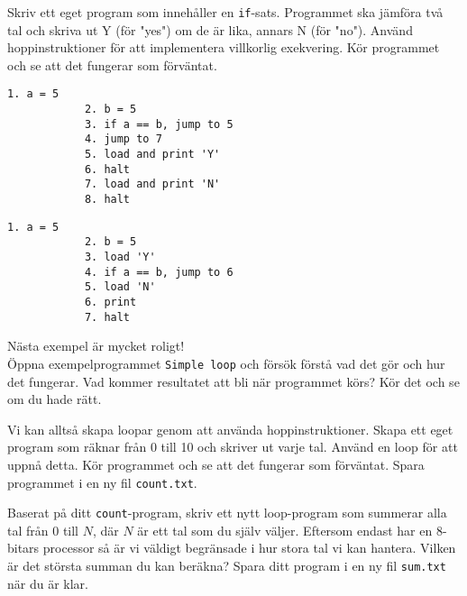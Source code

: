 \begin{Datorarbete}
    \item Skriv ett eget program som innehåller en \texttt{if}-sats. Programmet ska jämföra två tal och skriva ut Y (för "yes") om de är lika, annars N (för "no"). Använd hoppinstruktioner för att implementera villkorlig exekvering. Kör programmet och se att det fungerar som förväntat.

    \begin{minipage}[t]{0.42\textwidth}
        \begin{lstlisting}[xleftmargin=-15mm]
            1. a = 5
            2. b = 5
            3. if a == b, jump to 5
            4. jump to 7
            5. load and print 'Y'
            6. halt
            7. load and print 'N'
            8. halt
        \end{lstlisting}
    \end{minipage}
    \begin{minipage}[t]{0.42\textwidth}
        \begin{lstlisting}[xleftmargin=-15mm]
            1. a = 5
            2. b = 5
            3. load 'Y'
            4. if a == b, jump to 6
            5. load 'N'
            6. print
            7. halt
        \end{lstlisting}
    \end{minipage}

    \item Nästa exempel är mycket roligt! \smiley \\
    Öppna exempelprogrammet \texttt{Simple loop} och försök förstå vad det gör och hur det fungerar. Vad kommer resultatet att bli när programmet körs? Kör det och se om du hade rätt.

    \item Vi kan alltså skapa loopar genom att använda hoppinstruktioner. Skapa ett eget program som räknar från 0 till 10 och skriver ut varje tal. Använd en loop för att uppnå detta. Kör programmet och se att det fungerar som förväntat. Spara programmet i en ny fil \texttt{count.txt}.
    
    \item Baserat på ditt \texttt{count}-program, skriv ett nytt loop-program som summerar alla tal från 0 till \(N\), där \(N\) är ett tal som du själv väljer. Eftersom \progname{} endast har en 8-bitars processor så är vi väldigt begränsade i hur stora tal vi kan hantera. Vilken är det största summan du kan beräkna? Spara ditt program i en ny fil \texttt{sum.txt} när du är klar.
\end{Datorarbete}


